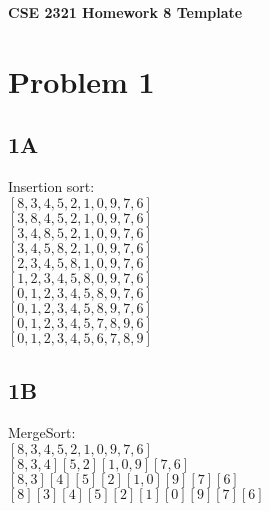\documentclass[14pt]{extarticle}
\begin{document}
\textbf{CSE 2321 Homework 8 Template}



\section*{Problem 1}

\subsection*{1A}

Insertion sort: \\

$[8, 3, 4, 5, 2, 1, 0, 9, 7, 6]$\\

$[3, 8, 4, 5, 2, 1, 0, 9, 7, 6]$\\

$[3, 4, 8, 5, 2, 1, 0, 9, 7, 6]$\\

$[3, 4, 5, 8, 2, 1, 0, 9, 7, 6]$\\

$[2, 3, 4, 5, 8, 1, 0, 9, 7, 6]$\\

$[1, 2, 3, 4, 5, 8, 0, 9, 7, 6]$\\

$[0, 1, 2, 3, 4, 5, 8, 9, 7, 6]$\\

$[0, 1, 2, 3, 4, 5, 8, 9, 7, 6]$\\

$[0, 1, 2, 3, 4, 5, 7, 8, 9, 6]$\\

$[0, 1, 2, 3, 4, 5, 6, 7, 8, 9]$\\


\subsection*{1B}

MergeSort: \\

$[8, 3, 4, 5, 2, 1, 0, 9, 7, 6]$\\

$[8, 3, 4] [5, 2] [1, 0, 9] [7, 6]$\\

$[8, 3] [4] [5] [2] [1, 0] [9] [7] [6]$\\

$[8] [3] [4] [5] [2] [1] [0] [9] [7] [6]$\\
\end{document}
